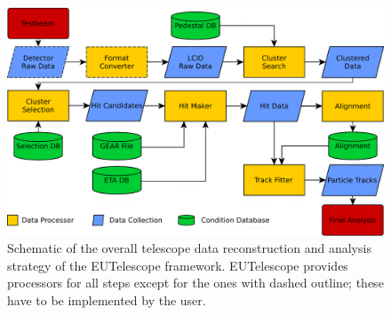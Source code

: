 \begin{figure}[tbp]
\center
\includegraphics[width=.9\textwidth]{figures/eutel-strategy.png}
\caption[The EUTelescope data analysis strategy]{Schematic of the overall telescope data reconstruction and analysis strategy of the EUTelescope framework.
EUTelescope provides processors for all steps except for the ones with dashed outline; these have to be implemented by the user.}
\label{fig:offline:strategy}
\end{figure}


